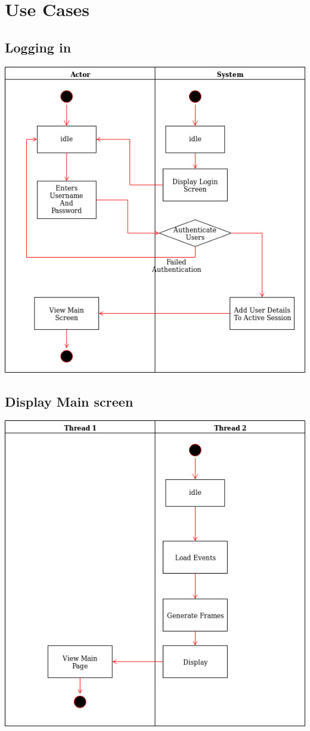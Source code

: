 \documentclass[11pt]{article}
\begin{document}
	\section{Use Cases}
	
	
	\subsection{Logging in}
	\includegraphics[scale=0.8]{Login.jpg}
	\subsection{Display Main screen}
	\includegraphics[scale=0.8]{Display}
\end{document}
